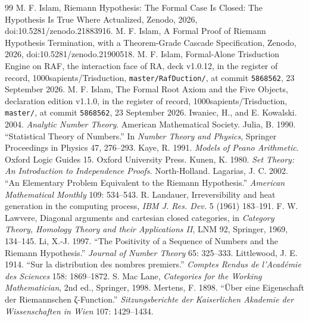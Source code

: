 \documentclass[10pt]{article}
\begin{document}
\begin{thebibliography}{99}
 M. F. Islam, Riemann Hypothesis: The Formal Case Is Closed: The Hypothesis Is True Where Actualized, Zenodo, 2026, doi:10.5281/zenodo.21883916.
 M. F. Islam, A Formal Proof of Riemann Hypothesis Termination, with a Theorem-Grade Cascade Specification, Zenodo, 2026, doi:10.5281/zenodo.21900518.
 M. F. Islam, Formal-Alone Trisduction Engine on RAF, the interaction face of RA, deck v1.0.12, in the register of record, 1000sapients/Trisduction, \texttt{master/RafDuction/}, at commit \texttt{5868562}, 23 September 2026.
 M. F. Islam, The Formal Root Axiom and the Five Objects, declaration edition v1.1.0, in the register of record, 1000sapients/Trisduction, \texttt{master/}, at commit \texttt{5868562}, 23 September 2026.
 Iwaniec, H., and E. Kowalski. 2004. \emph{Analytic Number Theory}. American Mathematical Society.
 Julia, B. 1990. ``Statistical Theory of Numbers.'' In \emph{Number Theory and Physics}, Springer Proceedings in Physics 47, 276--293.
 Kaye, R. 1991. \emph{Models of Peano Arithmetic}. Oxford Logic Guides 15. Oxford University Press.
 Kunen, K. 1980. \emph{Set Theory: An Introduction to Independence Proofs}. North-Holland.
 Lagarias, J. C. 2002. ``An Elementary Problem Equivalent to the Riemann Hypothesis.'' \emph{American Mathematical Monthly} 109: 534--543.
 R. Landauer, Irreversibility and heat generation in the computing process, \emph{IBM J. Res. Dev.} 5 (1961) 183--191.
 F. W. Lawvere, Diagonal arguments and cartesian closed categories, in \emph{Category Theory, Homology Theory and their Applications II}, LNM 92, Springer, 1969, 134--145.
 Li, X.-J. 1997. ``The Positivity of a Sequence of Numbers and the Riemann Hypothesis.'' \emph{Journal of Number Theory} 65: 325--333.
 Littlewood, J. E. 1914. ``Sur la distribution des nombres premiers.'' \emph{Comptes Rendus de l'Académie des Sciences} 158: 1869--1872.
 S. Mac Lane, \emph{Categories for the Working Mathematician}, 2nd ed., Springer, 1998.
 Mertens, F. 1898. ``Über eine Eigenschaft der Riemannschen ζ-Function.'' \emph{Sitzungsberichte der Kaiserlichen Akademie der Wissenschaften in Wien} 107: 1429--1434.

\end{thebibliography}
\end{document}
